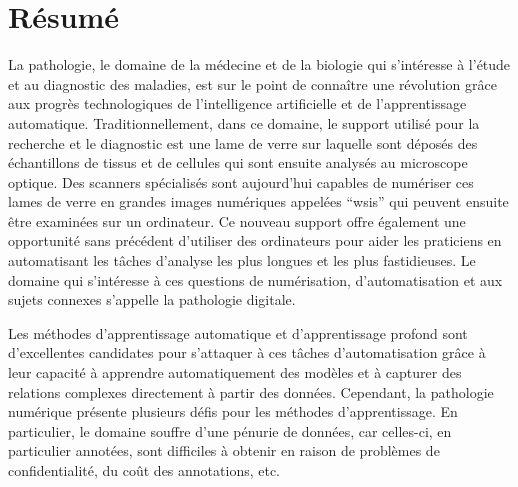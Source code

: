 \chapter*{Résumé}

La pathologie, le domaine de la médecine et de la biologie qui s'intéresse à l'étude et au diagnostic des maladies, est sur le point de connaître une révolution grâce aux progrès technologiques de l'intelligence artificielle et de l'apprentissage automatique. Traditionnellement, dans ce domaine, le support utilisé pour la recherche et le diagnostic est une lame de verre sur laquelle sont déposés des échantillons de tissus et de cellules qui sont ensuite analysés au microscope optique. Des scanners spécialisés sont aujourd'hui capables de numériser ces lames de verre en grandes images numériques appelées ``\acrlong{wsi}s'' qui peuvent ensuite être examinées sur un ordinateur. Ce nouveau support offre également une opportunité sans précédent d'utiliser des ordinateurs pour aider les praticiens en automatisant les tâches d'analyse les plus longues et les plus fastidieuses. Le domaine qui s'intéresse à ces questions de numérisation, d'automatisation et aux sujets connexes s'appelle la pathologie digitale.

Les méthodes d'apprentissage automatique et d'apprentissage profond sont d'excellentes candidates pour s'attaquer à ces tâches d'automatisation grâce à leur capacité à apprendre automatiquement des modèles et à capturer des relations complexes directement à partir des données. Cependant, la pathologie numérique présente plusieurs défis pour les méthodes d'apprentissage. En particulier, le domaine souffre d'une pénurie de données, car celles-ci, en particulier annotées, sont difficiles à obtenir en raison de problèmes de confidentialité, du coût des annotations, etc. 

